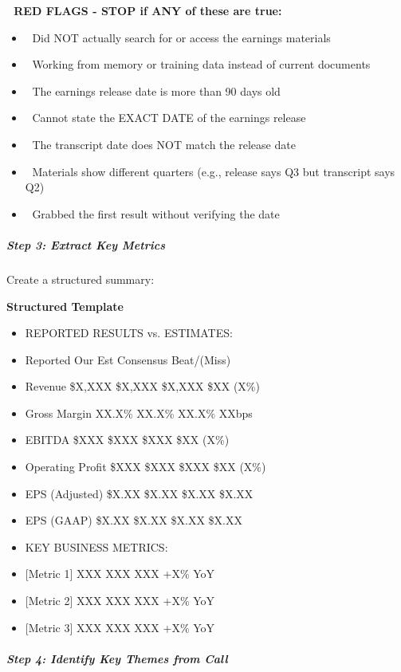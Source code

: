 \documentclass[11pt]{article}
\begin{document}
\textbf{🚨 RED FLAGS - STOP if ANY of these are true:}

\begin{itemize}[leftmargin=*,itemsep=2pt,topsep=2pt]
\item {} 🚨 Did NOT actually search for or access the earnings materials
\item {} 🚨 Working from memory or training data instead of current documents
\item {} 🚨 The earnings release date is more than 90 days old
\item {} 🚨 Cannot state the EXACT DATE of the earnings release
\item {} 🚨 The transcript date does NOT match the release date
\item {} 🚨 Materials show different quarters (e.g., release says Q3 but transcript says Q2)
\item {} 🚨 Grabbed the first result without verifying the date
\end{itemize}

\subparagraph{Step 3: Extract Key Metrics}\mbox{}\par

Create a structured summary:


\textbf{Structured Template}
\begin{itemize}[leftmargin=*,itemsep=2pt,topsep=2pt]
\item {} REPORTED RESULTS vs. ESTIMATES:
\item {} Reported Our Est Consensus Beat/(Miss)
\item {} Revenue \$X,XXX \$X,XXX \$X,XXX \$XX (X\%)
\item {} Gross Margin XX.X\% XX.X\% XX.X\% XXbps
\item {} EBITDA \$XXX \$XXX \$XXX \$XX (X\%)
\item {} Operating Profit \$XXX \$XXX \$XXX \$XX (X\%)
\item {} EPS (Adjusted) \$X.XX \$X.XX \$X.XX \$X.XX
\item {} EPS (GAAP) \$X.XX \$X.XX \$X.XX \$X.XX
\item {} KEY BUSINESS METRICS:
\item {} [Metric 1] XXX XXX XXX +X\% YoY
\item {} [Metric 2] XXX XXX XXX +X\% YoY
\item {} [Metric 3] XXX XXX XXX +X\% YoY
\end{itemize}

\subparagraph{Step 4: Identify Key Themes from Call}\mbox{}\par
\end{document}
